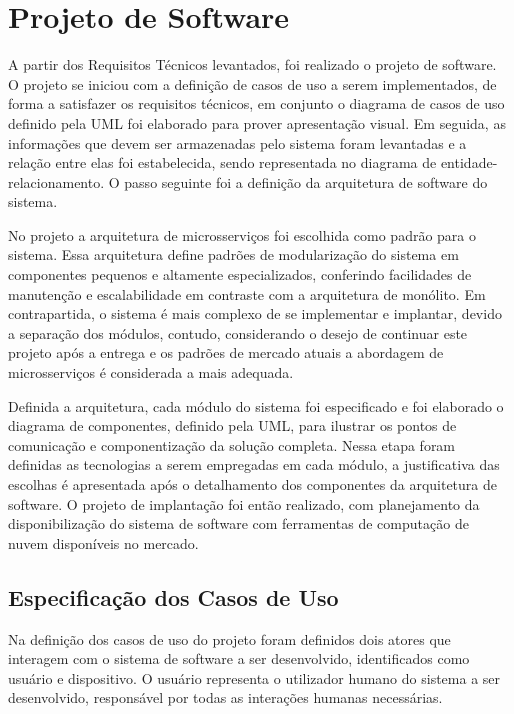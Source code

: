 \section{Projeto de Software}


A partir dos Requisitos Técnicos levantados, foi realizado o projeto de software. O projeto se iniciou com a definição de casos de uso a serem implementados, de forma a satisfazer os requisitos técnicos, em conjunto o diagrama de casos de uso definido pela UML foi elaborado para prover apresentação visual. Em seguida, as informações que devem ser armazenadas pelo sistema foram levantadas e a relação entre elas foi estabelecida, sendo representada no diagrama de entidade-relacionamento. O passo seguinte foi a definição da arquitetura de software do sistema.

No projeto a arquitetura de microsserviços foi escolhida como padrão para o sistema. Essa arquitetura define padrões de modularização do sistema em componentes pequenos e altamente especializados, conferindo facilidades de manutenção e escalabilidade em contraste com a arquitetura de monólito. Em contrapartida, o sistema é mais complexo de se implementar e implantar, devido a separação dos módulos, contudo, considerando o desejo de continuar este projeto após a entrega e os padrões de mercado atuais a abordagem de microsserviços é considerada a mais adequada. 

Definida a arquitetura, cada módulo do sistema foi especificado e foi elaborado o diagrama de componentes, definido pela UML, para ilustrar os pontos de comunicação e componentização da solução completa. Nessa etapa foram definidas as tecnologias a serem empregadas em cada módulo, a justificativa das escolhas é apresentada após o detalhamento dos componentes da arquitetura de software. O projeto de implantação foi então realizado, com planejamento da disponibilização do sistema de software com ferramentas de computação de nuvem disponíveis no mercado.


\subsection{Especificação dos Casos de Uso}

Na definição dos casos de uso do projeto foram definidos dois atores que interagem com o sistema de software a ser desenvolvido, identificados como 
usuário e dispositivo. O usuário representa o utilizador humano do sistema a ser desenvolvido, responsável por todas as interações humanas necessárias. 

